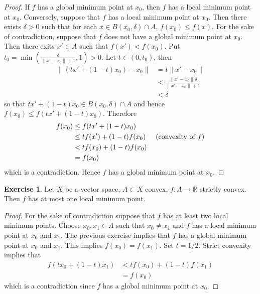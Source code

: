 \documentclass[12pt]{amsart}
\theoremstyle{definition}
\newtheorem{ex}[definition]{Exercise}
\newcommand{\del}{\delta}
\newcommand{\R}{\mathbb{R}}
\begin{document}
	\begin{proof}
	If $f$ has a global minimum point at $x_0$, then $f$ has a local minimum point at $x_0$. Conversely, suppose that $f$ has a local minimum point at $x_0$. Then there exists $\del >0$ such that for each $x \in B(x_0, \del) \cap A$, $f(x_0) \leq f(x)$. For the sake of contradiction, suppose that $f$ does not have a global minimum point at $x_0$. Then there exits $x' \in A$ such that $f(x') < f(x_0)$. Put $t_0 = \min(\frac{\del}{\|x' - x_0\| + 1}, 1) >0$. Let $t \in (0, t_0)$, then
	\begin{align*}
	\|(tx' + (1-t)x_0) - x_0\| 
	&= t\|x' -x_0 \| \\
	& <   \frac{\|x' -x_0 \|\del}{\|x' -x_0\| + 1} \\
	& < \del
	\end{align*} 
	so that $tx' + (1-t)x_0 \in B(x_0, \del) \cap A$ and hence $f(x_0) \leq f(tx' + (1-t)x_0)$.  Therefore  
	\begin{align*}
	f(x_0) 
	& \leq f(tx' + (1-t)x_0) \\
	& \leq tf(x') + (1-t)f(x_0)  \hspace{.5cm} (\text{convexity of }f)\\
	& < tf(x_0) + (1-t)f(x_0) \\
	&= f(x_0)
	\end{align*}
	which is a contradiction. Hence $f$ has a global minimum point at $x_0$.
	\end{proof}
	
	\begin{ex}
	Let $X$ be a vector space, $A \subset X$ convex, $f:A \rightarrow \R$ strictly convex. Then $f$ has at most one local minimum point.
	\end{ex}
	
	\begin{proof}
	For the sake of contradiction suppose that $f$ has at least two local minimum points. Choose $x_0, x_1 \in A$ such that $x_0 \neq x_1$ and $f$ has a local minimum point at $x_0$ and $x_1$. The previous exercise implies that $f$ has a global minimum point at $x_0$ and $x_1$. This implies $f(x_0) = f(x_1)$. Set $t = 1/2$. Strict convexity implies that 
	\begin{align*}
	f(tx_0 + (1-t)x_1) 
	&< tf(x_0) + (1-t)f(x_1)  \\
	&= f(x_0) 
	\end{align*}
	which is a contradiction since $f$ has a global minimum point at $x_0$.
	\end{proof}
\end{document}
